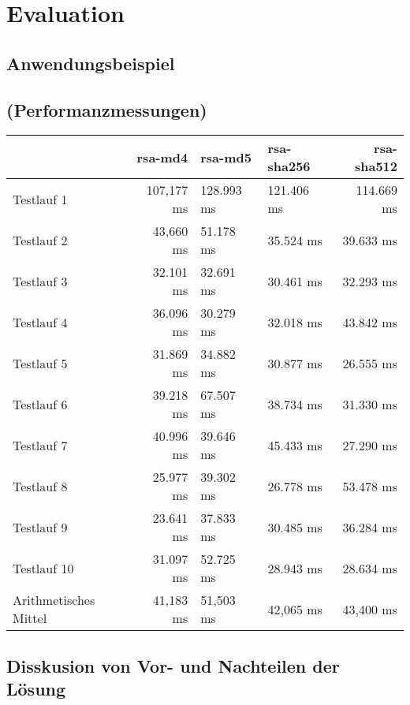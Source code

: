 
\chapter{Evaluation}
\label{ch:Evaluation}

\section{Anwendungsbeispiel}
\section{(Performanzmessungen)}
\begin{tabularx}{\textwidth}{p{}|r|X|X|r}
	 & rsa-md4 & rsa-md5 & rsa-sha256 & rsa-sha512\\
	\hline
	Testlauf 1& 107,177 ms& 128.993 ms& 121.406 ms& 114.669 ms\\
	Testlauf 2& 43,660 ms& 51.178 ms& 35.524 ms& 39.633 ms\\
	Testlauf 3& 32.101 ms& 32.691 ms& 30.461 ms& 32.293 ms\\
	Testlauf 4& 36.096 ms& 30.279 ms& 32.018 ms& 43.842 ms\\
	Testlauf 5& 31.869 ms& 34.882 ms& 30.877 ms& 26.555 ms\\
	Testlauf 6& 39.218 ms& 67.507 ms& 38.734 ms& 31.330 ms\\
	Testlauf 7& 40.996 ms& 39.646 ms& 45.433 ms& 27.290 ms\\
	Testlauf 8& 25.977 ms& 39.302 ms& 26.778 ms& 53.478 ms\\
	Testlauf 9& 23.641 ms& 37.833 ms& 30.485 ms& 36.284 ms\\
	Testlauf 10& 31.097 ms& 52.725 ms& 28.943 ms& 28.634 ms\\
	\hline
	Arithmetisches Mittel& 41,183 ms& 51,503 ms& 42,065 ms& 43,400 ms\\
\end{tabularx}
\section{Disskusion von Vor- und Nachteilen der Lösung}
